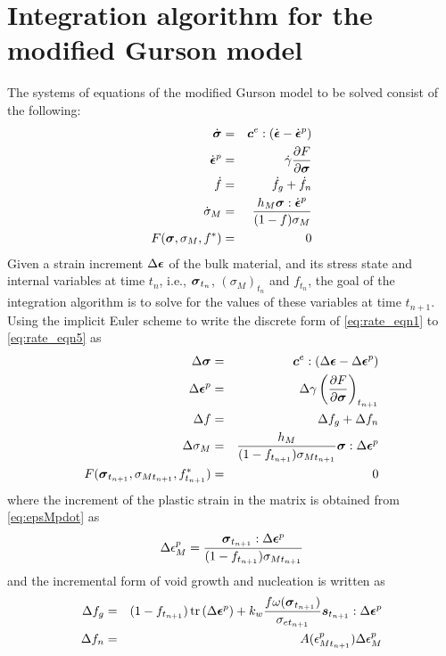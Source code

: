 \section{Integration algorithm for the modified Gurson model}\label{implicit}
The systems of equations of the modified Gurson model to be solved consist of the following:
\begin{eqnarray}
	\dot{{\boldsymbol{\sigma}}} &=& {\boldsymbol{c}}^e : \left(
        \dot{{\boldsymbol{\epsilon}}} -
        \dot{{\boldsymbol{\epsilon}}}^p\right) \label{eq:rate_eqn1}
        \\ \dot{{\boldsymbol{\epsilon}}}^p &=& \dot{\gamma}\frac{\partial
          F}{\partial{\boldsymbol{\sigma}}} \label{eq:rate_eqn2}\\ \dot{f} &=&
        \dot{f}_g + \dot{f}_n \label{eq:rate_eqn3}\\ \dot{\sigma}_M
        &=& \frac{h_M{\boldsymbol{\sigma}} :
          \dot{{\boldsymbol{\epsilon}}}^p}{(1-f)\sigma_M} \label{eq:rate_eqn4}\\ F({\boldsymbol{\sigma}},
        \sigma_M, f^*) &=& 0 \label{eq:rate_eqn5}
\end{eqnarray}
Given a strain increment $\Delta{\boldsymbol{\epsilon}}$ of the bulk material,
and its stress state and internal variables at time $t_n$, i.e.,
${\boldsymbol{\sigma}}_{t_n}$, $(\sigma_M)_{t_n}$ and $f_{t_n}$, the goal of
the integration algorithm is to solve for the values of these
variables at time $t_{n+1}$. Using the implicit Euler scheme to write
the discrete form of \eqref{eq:rate_eqn1} to \eqref{eq:rate_eqn5} as
\begin{eqnarray}
	\Delta{\boldsymbol{\sigma}} &=& {\boldsymbol{c}}^e : \left( \Delta{\boldsymbol{\epsilon}} -  \Delta{\boldsymbol{\epsilon}}^p\right)  \label{eq:dis_eqn1} \\
	\Delta{\boldsymbol{\epsilon}}^p &=&\Delta\gamma\left( \frac{\partial F}{\partial{\boldsymbol{\sigma}}} \right) _{t_{n+1}} \label{eq:dis_eqn2}\\	
	\Delta f &=&\Delta f_g + \Delta f_n \label{eq:dis_eqn3}\\	
	\Delta\sigma_M &=& \frac{h_M}{(1-f_{t_{n+1}})\sigma_{Mt_{n+1}}}{\boldsymbol{\sigma}}:\Delta{\boldsymbol{\epsilon}}^p \label{eq:dis_eqn4}\\	
	F( {\boldsymbol{\sigma}}_{t_{n+1}}, \sigma_{Mt_{n+1}}, f^*_{t_{n+1}}) &=& 0 \label{eq:dis_eqn5}
\end{eqnarray}
where the increment of the plastic strain in the matrix is obtained from \eqref{eq:epsMpdot} as
\begin{equation}
\Delta\epsilon_M^p = \frac{{\boldsymbol{\sigma}}_{t_{n+1}}:\Delta{\boldsymbol{\epsilon}}^p}{(1-f_{t_{n+1}})\sigma_{Mt_{n+1}}}
\end{equation}
and the incremental form of void growth and nucleation is written as
\begin{eqnarray}
	\Delta f_g &=& (1-f_{t_{n+1}}) \operatorname{\text{tr}} \left( \Delta{\boldsymbol{\epsilon}}^p\right) + k_w\frac{f \omega({\boldsymbol{\sigma}}_{t_{n+1}})}{\sigma_{et_{n+1}}}{\boldsymbol{s}}_{t_{n+1}}: \Delta{\boldsymbol{\epsilon}}^p \\
	\Delta f_n &=&  A(\epsilon_{Mt_{n+1}}^p)\Delta\epsilon_M^p\\	
\end{eqnarray}
